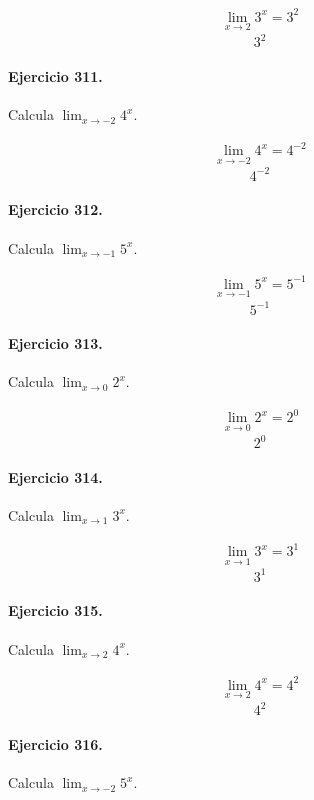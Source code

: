 \documentclass[11pt,a4paper]{article}
\begin{document}
\[
\begin{aligned}
\lim_{x\to 2}3^x=3^{2}
\end{aligned}
\]
\[\boxed{3^{2}}\]


\paragraph{Ejercicio 311.} Calcula $\displaystyle\lim_{x\to -2}4^x$.

\[
\begin{aligned}
\lim_{x\to -2}4^x=4^{-2}
\end{aligned}
\]
\[\boxed{4^{-2}}\]


\paragraph{Ejercicio 312.} Calcula $\displaystyle\lim_{x\to -1}5^x$.

\[
\begin{aligned}
\lim_{x\to -1}5^x=5^{-1}
\end{aligned}
\]
\[\boxed{5^{-1}}\]


\paragraph{Ejercicio 313.} Calcula $\displaystyle\lim_{x\to 0}2^x$.

\[
\begin{aligned}
\lim_{x\to 0}2^x=2^{0}
\end{aligned}
\]
\[\boxed{2^{0}}\]


\paragraph{Ejercicio 314.} Calcula $\displaystyle\lim_{x\to 1}3^x$.

\[
\begin{aligned}
\lim_{x\to 1}3^x=3^{1}
\end{aligned}
\]
\[\boxed{3^{1}}\]


\paragraph{Ejercicio 315.} Calcula $\displaystyle\lim_{x\to 2}4^x$.

\[
\begin{aligned}
\lim_{x\to 2}4^x=4^{2}
\end{aligned}
\]
\[\boxed{4^{2}}\]


\paragraph{Ejercicio 316.} Calcula $\displaystyle\lim_{x\to -2}5^x$.
\end{document}
